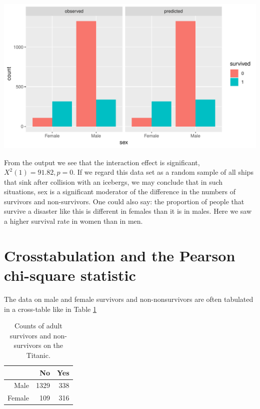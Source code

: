 \documentclass[]{book}\usepackage[]{graphicx}\usepackage[]{color}
\makeatletter
\def\maxwidth{ %
  \ifdim\Gin@nat@width>\linewidth
    \linewidth
  \else
    \Gin@nat@width
  \fi
}
\makeatother
\begin{document}
{\centering \includegraphics[width=\maxwidth]{figure/gen_23-1} 

}




From the output we see that the interaction effect is significant, $X^2(1)=91.82, p=0$. If we regard this data set as a random sample of all ships that sink after collision with an icebergs, we may conclude that in such situations, sex is a significant moderator of the difference in the numbers of survivors and non-survivors. One could also say: the proportion of people that survive a disaster like this is different in females than it is in males. Here we saw a higher survival rate in women than in men.


\section{Crosstabulation and the Pearson chi-square statistic}

The data on male and female survivors and non-nonsurvivors are often tabulated in a cross-table like in Table \ref{tab:gen_24}


\begin{table}[ht]
\centering
\caption{Counts of adult survivors and non-survivors on the Titanic.} 
\label{tab:gen_24}
\begin{tabular}{rrr}
  \hline
 & No & Yes \\ 
  \hline
Male & 1329 & 338 \\ 
  Female & 109 & 316 \\ 
   \hline
\end{tabular}
\end{table}
\end{document}
